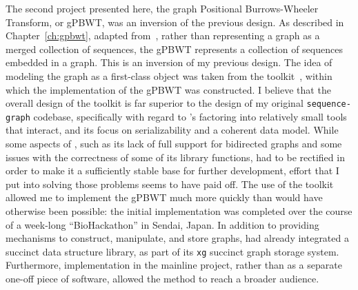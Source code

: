 
The second project presented here, the graph Positional Burrows-Wheeler Transform, or gPBWT, was an inversion of the previous design. As described in Chapter~\ref{ch:gpbwt}, adapted from~\citet{novak2016graph}, rather than representing a graph as a merged collection of sequences, the gPBWT represents a collection of sequences embedded in a graph. This is an inversion of my previous design. The idea of modeling the graph as a first-class object was taken from the \vg toolkit~\cite{garrison2016vg}, within which the implementation of the gPBWT was constructed. I believe that the overall design of the \vg toolkit is far superior to the design of my original \texttt{sequence-graph} codebase, specifically with regard to \vg's factoring into relatively small tools that interact, and its focus on serializability and a coherent data model. While some aspects of \vg, such as its lack of full support for bidirected graphs and some issues with the correctness of some of its library functions, had to be rectified in order to make it a sufficiently stable base for further development, effort that I put into solving those problems seems to have paid off. The use of the \vg toolkit allowed me to implement the gPBWT much more quickly than would have otherwise been possible: the initial implementation was completed over the course of a week-long ``BioHackathon'' in Sendai, Japan. In addition to providing mechanisms to construct, manipulate, and store graphs, \vg had already integrated a succinct data structure library, as part of its \texttt{xg} succinct graph storage system. Furthermore, implementation in the mainline \vg project, rather than as a separate one-off piece of software, allowed the method to reach a broader audience.


